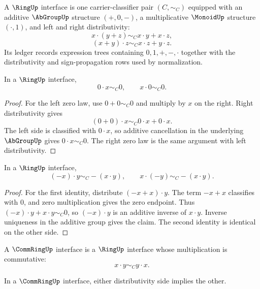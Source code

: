 \begin{definition}
\label{def:algebra-spine-ring}
A $\RingUp$ interface is one carrier-classifier pair $(C,\sim_C)$ equipped
with an additive $\AbGroupUp$ structure $(+,0,-)$, a multiplicative
$\MonoidUp$ structure $(\cdot,1)$, and left and right distributivity:
$$
x\cdot(y+z)\sim_C x\cdot y+x\cdot z,
$$
$$
(x+y)\cdot z\sim_C x\cdot z+y\cdot z.
$$
Its ledger records expression trees containing $0,1,+,-,\cdot$ together with
the distributivity and sign-propagation rows used by normalization.
\end{definition}

\begin{theorem}
\label{thm:algebra-spine-zero-multiplication}
In a $\RingUp$ interface,
$$
0\cdot x\sim_C0,
\qquad
x\cdot0\sim_C0.
$$
\end{theorem}

\begin{proof}
For the left zero law, use $0+0\sim_C0$ and multiply by $x$ on the right.
Right distributivity gives
$$
(0+0)\cdot x\sim_C0\cdot x+0\cdot x.
$$
The left side is classified with $0\cdot x$, so additive cancellation in the
underlying $\AbGroupUp$ gives $0\cdot x\sim_C0$.  The right zero law is the
same argument with left distributivity.
\end{proof}

\begin{theorem}
\label{thm:algebra-spine-negative-products}
In a $\RingUp$ interface,
$$
(-x)\cdot y\sim_C-(x\cdot y),
\qquad
x\cdot(-y)\sim_C-(x\cdot y).
$$
\end{theorem}

\begin{proof}
For the first identity, distribute $(-x+x)\cdot y$.  The term
$-x+x$ classifies with $0$, and zero multiplication gives the zero endpoint.
Thus $(-x)\cdot y+x\cdot y\sim_C0$, so $(-x)\cdot y$ is an additive inverse
of $x\cdot y$.  Inverse uniqueness in the additive group gives the claim.
The second identity is identical on the other side.
\end{proof}

\begin{definition}
\label{def:algebra-spine-commring}
A $\CommRingUp$ interface is a $\RingUp$ interface whose multiplication is
commutative:
$$
x\cdot y\sim_Cy\cdot x.
$$
\end{definition}

\begin{theorem}
\label{thm:algebra-spine-distributivity-side-transport}
In a $\CommRingUp$ interface, either distributivity side implies the other.
\end{theorem}

